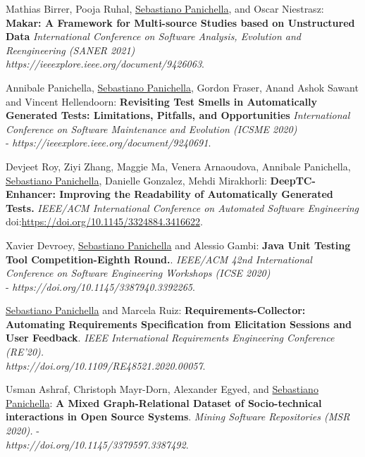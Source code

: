 \documentclass[10pt]{article}
\newcommand\doilink[1]{\href{http://dx.doi.org/#1}{#1}}
\newcommand\doi[1]{doi:\doilink{#1}}
\begin{document}
\begin{bibenum}
      \item \label{Cm17_2} Mathias Birrer, Pooja Ruhal, \underline{Sebastiano Panichella}, and Oscar Niestrasz:  \textbf{Makar: A Framework for Multi-source Studies based on Unstructured Data}  \emph{International Conference on Software Analysis, Evolution and Reengineering (SANER 2021)}\\ \textit{https://ieeexplore.ieee.org/document/9426063}.   
      \item \label{Cm17} Annibale Panichella, \underline{Sebastiano Panichella}, Gordon Fraser, Anand Ashok Sawant and Vincent Hellendoorn:  \textbf{Revisiting Test Smells in Automatically Generated Tests: Limitations, Pitfalls, and Opportunities}  \emph{International Conference on Software Maintenance and Evolution (ICSME 2020)} \\- \textit{https://ieeexplore.ieee.org/document/9240691}. 
      \item \label{Cm16} Devjeet Roy, Ziyi Zhang, Maggie Ma, Venera Arnaoudova, Annibale Panichella,  \underline{Sebastiano Panichella}, Danielle Gonzalez, Mehdi Mirakhorli:  \textbf{DeepTC-Enhancer: Improving the Readability of Automatically Generated Tests.}  \emph{IEEE/ACM International Conference on Automated Software Engineering} \\ \doi{https://doi.org/10.1145/3324884.3416622}. 
      \item \label{Cm15} Xavier Devroey, \underline{Sebastiano Panichella} and Alessio Gambi:  \textbf{Java Unit Testing Tool Competition-Eighth Round.}.  \emph{IEEE/ACM 42nd International Conference on Software Engineering Workshops (ICSE 2020)} \\- \textit{https://doi.org/10.1145/3387940.3392265}. 
    \item \label{Cm14} \underline{Sebastiano Panichella} and Marcela Ruiz:  \textbf{Requirements-Collector: Automating Requirements Specification from Elicitation Sessions and User Feedback}.  \emph{IEEE International Requirements Engineering Conference (RE'20).} \\\textit{https://doi.org/10.1109/RE48521.2020.00057}. 
      \item \label{Cm13} Usman Ashraf, Christoph Mayr-Dorn, Alexander Egyed, and \underline{Sebastiano Panichella}:  \textbf{A Mixed Graph-Relational Dataset of Socio-technical interactions in Open Source Systems}.  \emph{Mining Software Repositories (MSR 2020).} - \\\textit{https://doi.org/10.1145/3379597.3387492}. %


\end{bibenum}
\end{document}
